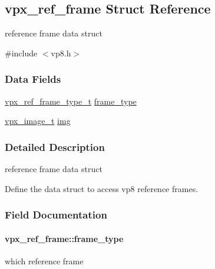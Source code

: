 \hypertarget{structvpx__ref__frame}{}\subsection{vpx\+\_\+ref\+\_\+frame Struct Reference}
\label{structvpx__ref__frame}


reference frame data struct  




{\ttfamily \#include $<$vp8.\+h$>$}

\subsubsection*{Data Fields}
\begin{DoxyCompactItemize}
\item 
\hyperlink{group__vp8_ga75ac0689a81bf7202382a225c5b451b4}{vpx\+\_\+ref\+\_\+frame\+\_\+type\+\_\+t} \hyperlink{structvpx__ref__frame_a7fbe51de592d0ff16d9fbd4d2b367c9b}{frame\+\_\+type}
\item 
\hyperlink{vpx__image_8h_abf5ac962cc6d71b4f0e39b1b0d033e55}{vpx\+\_\+image\+\_\+t} \hyperlink{structvpx__ref__frame_a972d24d0243f51f84eef7e1b79c6c414}{img}
\end{DoxyCompactItemize}


\subsubsection{Detailed Description}
reference frame data struct 

Define the data struct to access vp8 reference frames. 

\subsubsection{Field Documentation}
\paragraph[{\texorpdfstring{frame\+\_\+type}{frame_type}}]{ vpx\+\_\+ref\+\_\+frame\+::frame\+\_\+type}\hypertarget{structvpx__ref__frame_a7fbe51de592d0ff16d9fbd4d2b367c9b}{}\label{structvpx__ref__frame_a7fbe51de592d0ff16d9fbd4d2b367c9b}
which reference frame 
